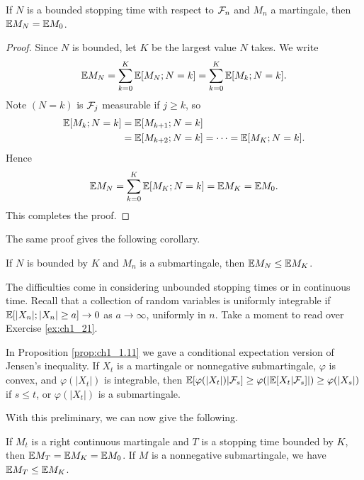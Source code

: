 \begin{theorem}\label{thm:ch1_4.2}
If $N$ is a bounded stopping time with respect to $\mathcal{F}_n$ and $M_n$ a martingale, then $\mathbb{E} M_N = \mathbb{E} M_0$.
\end{theorem}

\begin{proof}
Since $N$ is bounded, let $K$ be the largest value $N$ takes. We write
\[
    \mathbb{E} M_N = \sum_{k=0}^K \mathbb{E}[M_N;N = k] = \sum_{k=0}^K \mathbb{E}[M_k;N = k].
\]
Note $(N = k)$ is $\mathcal{F}_j$ measurable if $j \geq k$, so
\begin{align*}
    \mathbb{E}[M_k;N = k] &= \mathbb{E}[M_{k+1};N = k] \\
    &= \mathbb{E}[M_{k+2};N = k] = \cdots = \mathbb{E}[M_K;N = k].
\end{align*}
Hence
\[
    \mathbb{E} M_N = \sum_{k=0}^K \mathbb{E}[M_K;N = k] = \mathbb{E} M_K = \mathbb{E} M_0.
\]
This completes the proof.
\end{proof}


The same proof gives the following corollary.

\begin{corollary}\label{cor:ch1_4.3}
If $N$ is bounded by $K$ and $M_n$ is a submartingale, then $\mathbb{E} M_N \leq \mathbb{E} M_K$.
\end{corollary}

The difficulties come in considering unbounded stopping times or in continuous time. Recall that a collection of random variables is uniformly integrable if $\mathbb{E}[|X_n|;|X_n| \geq a] \to 0$ as $a \to \infty$, uniformly in $n$. Take a moment to read over Exercise \ref{ex:ch1_21}.

In Proposition \ref{prop:ch1_1.11} we gave a conditional expectation version of Jensen's inequality. If $X_t$ is a martingale or nonnegative submartingale, $\varphi$ is convex, and $\varphi(|X_t|)$ is integrable, then $\mathbb{E}[\varphi(|X_t|)|\mathcal{F}_s] \geq \varphi(|\mathbb{E}[X_t| \mathcal{F}_s]|) \geq \varphi(|X_s|)$ if $s \leq t$, or $\varphi(|X_t|)$ is a submartingale.

With this preliminary, we can now give the following.

\begin{theorem}\label{thm:ch1_4.4}
If $M_t$ is a right continuous martingale and $T$ is a stopping time bounded by $K$, then $\mathbb{E} M_T = \mathbb{E} M_K = \mathbb{E} M_0$. If $M$ is a nonnegative submartingale, we have $\mathbb{E} M_T \leq \mathbb{E} M_K$.
\end{theorem}

